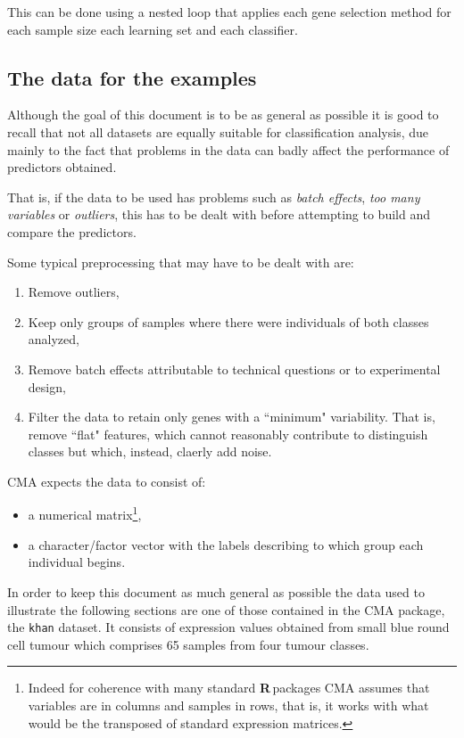 \documentclass{article}\usepackage[]{graphicx}\usepackage[]{color}
\newcommand{\R}{\textbf{R}\,}
\begin{document}
This can be done using a nested loop that applies each gene selection
method for each sample size each learning set and each classifier.

\subsection{The data for the examples}

Although the goal of this document is to be as general as possible it
is good to recall that not all datasets are equally suitable for
classification analysis, due mainly to the fact that problems in the data can badly affect the performance of predictors obtained.

That is, if the data to be used has problems such as \emph{batch effects}, \emph{too many variables} or \emph{outliers}, this has to be dealt with before attempting to build
and compare the predictors.

Some typical preprocessing that may have to be dealt with are:
\begin{enumerate}
\item Remove outliers, 
\item Keep only groups of samples where there were individuals of both classes analyzed,
\item Remove batch effects attributable to technical questions or to experimental design,
\item Filter the data to retain only genes with a ``minimum" variability. That is, remove ``flat" features, which cannot reasonably contribute to distinguish classes but which, instead, claerly add noise.
\end{enumerate}

CMA expects the data to consist of:
\begin{itemize}
  \item a numerical matrix\footnote{Indeed for coherence with many standard \R packages CMA assumes that variables are in columns and samples in rows, that is, it works with what would be the transposed of standard expression matrices.}, 
  \item a character/factor vector with the labels describing to which group each individual begins.
\end{itemize}

In order to keep this document as much general as possible the data used to illustrate the following sections are one of those contained in the CMA package, the \texttt{khan} dataset. It consists of expression values obtained from small blue round cell tumour which
comprises 65 samples from four tumour classes.
\end{document}
